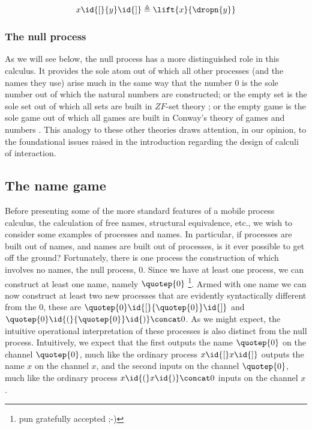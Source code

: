 \begin{eqnarray}
	{x}\id{[}{y}\id{]} \triangleq \lift{x}{\dropn{y}} \nonumber
\end{eqnarray}

\subsubsection{The null process}

As we will see below, the null process has a more distinguished role
in this calculus. It provides the sole atom out of which all other
processes (and the names they use) arise much in the same way that the
number $0$ is the sole number out of which the natural numbers are
constructed; or the empty set is the sole set out of which all sets
are built in $ZF$-set theory \cite{Krivine-TheCurryHowardCorre}; or
the empty game is the sole game out of which all games are built in
Conway's theory of games and numbers \cite{ONAG}. This analogy to
these other theories draws attention, in our opinion, to the
foundational issues raised in the introduction regarding the design of
calculi of interaction.

\subsection{The name game}

Before presenting some of the more standard features of a mobile
process calculus, the calculation of free names, structural
equivalence, etc., we wish to consider some examples of processes and
names. In particular, if processes are built out of names, and names
are built out of processes, is it ever possible to get off the ground?
Fortunately, there is one process the construction of which involves
no names, the null process, $0$. Since we have at least one process,
we can construct at least one name, namely $\quotep{0}$ \footnote{pun
gratefully accepted ;-)}. Armed with one name we can now construct at
least two new processes that are evidently syntactically different
from the $0$, these are $\quotep{0}\id{[}{\quotep{0}}\id{]}$ and
$\quotep{0}\id{(}{\quotep{0}}\id{)} \concat 0$. As we might expect,
the intuitive operational interpretation of these processes is also
distinct from the null process. Intuitively, we expect that the first
outputs the name $\quotep{0}$ on the channel $\quotep{0}$, much like
the ordinary {\pic} process $x\id{[}x\id{]}$ outputs the name $x$ on
the channel $x$, and the second inputs on the channel $\quotep{0}$,
much like the ordinary {\pic} process $x\id{(}x\id{)} \concat 0$
inputs on the channel $x$.

